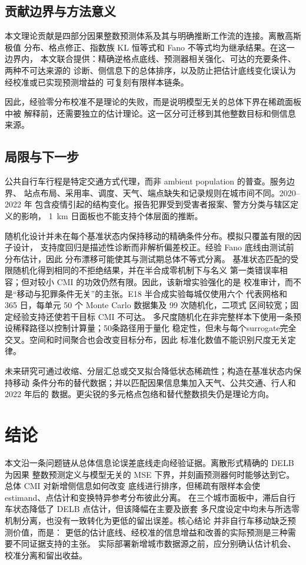 \subsection{贡献边界与方法意义}
\label{subsec:discussion_contributions}

本文理论贡献是四部分因果整数预测体系及其与明确推断工作流的连接。离散高斯极值
分布、格点修正、指数族 KL 恒等式和 Fano 不等式均为继承结果。在这一边界内，
本文联合提供：精确逆格点底线、预测器相关强化、可达的充要条件、两种不可达来源的
诊断、侧信息下的总体排序，以及防止把估计底线变化误认为经校准或已实现预测增益的
可复刻有限样本链条。

因此，经验零分布校准不是理论的失败，而是说明模型无关的总体下界在稀疏面板中被
解释前，还需要独立的估计理论。这一区分可迁移到其他整数目标和侧信息来源。

\subsection{局限与下一步}
\label{subsec:limitations}

公共自行车行程是特定交通方式代理，而非 ambient population 的普查。服务边界、
站点布局、采用率、调度、天气、端点缺失和记录规则在城市间不同。2020--2022 年
包含疫情引起的结构变化。报告犯罪受到受害者报案、警方分类与辖区定义的影响，
1~km 日面板也不能支持个体层面的推断。

随机化设计并未在每个基准状态内保持移动的精确条件分布。模拟只覆盖有限的因子设计，
支持度回归是描述性诊断而非解析偏差校正。经验 Fano 底线由测试前分布估计，因此
分布漂移可能使其与测试期总体不等式分离。
基准状态匹配的受限随机化得到相同的不拒绝结果，并在半合成零机制下与名义
第一类错误率相容；但对较小 CMI 的功效仍然有限。因此，该新增实验强化的是
校准审计，而不是“移动与犯罪条件无关”的主张。E18 半合成实验每城仅使用六个
代表网格和 365 日，每单元 50 个 Monte Carlo 数据集及 99 次随机化，二项式
区间较宽；固定经验支持还使若干目标 CMI 不可达。
多尺度随机化在非完整样本下使用一条预设稀释路径以控制计算量；50条路径用于量化
稳定性，但未与每个surrogate完全交叉。空间和时间聚合也会改变目标分布，因此
标准化数值不能识别尺度无关定律。

未来研究可通过收缩、分层汇总或交叉拟合降低状态稀疏性；构造在基准状态内保持移动
条件分布的替代数据；并以匹配因果信息集加入天气、公共交通、行人和 2022 年后的
数据。更尖锐的多元格点包络和替代整数损失仍是理论方向。

\section{结论}
\label{sec:conclusions}

本文沿一条问题链从总体信息论误差底线走向经验证据。离散形式精确的 DELB 为因果
整数预测定义与模型无关的 MSE 下界，并刻画预测器何时能够达到它。总体 CMI 对新增侧信息如何改变
底线进行排序，但稀疏有限样本会使 estimand、点估计和变换特异参考分布彼此分离。
在三个城市面板中，滞后自行车状态降低了 DELB 点估计，但该降幅在主要及嵌套
多尺度设定中均未与所选零机制分离，也没有一致转化为更低的留出误差。核心结论
并非自行车移动缺乏预测价值，而是：
更低的估计底线、经校准的信息增益和改善的实际预测是三种需要不同证据支持的主张。
实际部署新增城市数据源之前，应分别确认估计机会、校准分离和留出收益。
